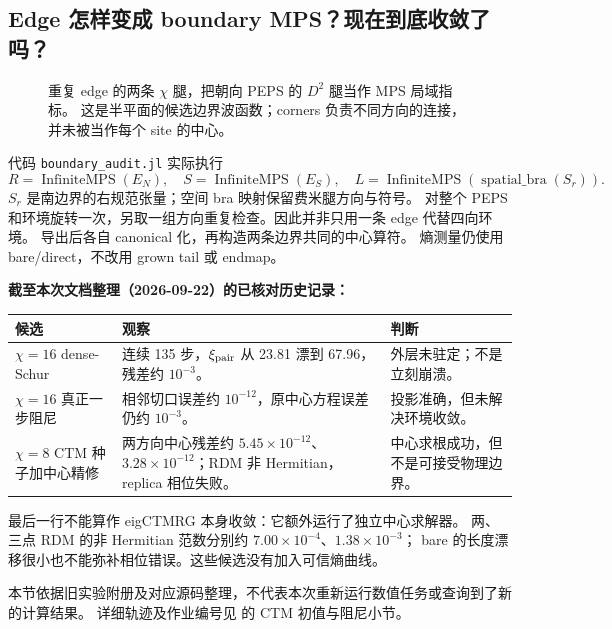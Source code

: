 \subsection{Edge 怎样变成 boundary MPS？现在到底收敛了吗？}
\begin{figure}[H]\centering
{}
\caption{重复 edge 的两条 $\chi$ 腿，把朝向 PEPS 的 $D^2$ 腿当作 MPS 局域指标。
这是半平面的候选边界波函数；corners 负责不同方向的连接，并未被当作每个 site 的中心。}
\end{figure}
代码 \texttt{boundary\_audit.jl} 实际执行
\[
R=\operatorname{InfiniteMPS}(E_N),\quad
S=\operatorname{InfiniteMPS}(E_S),\quad
L=\operatorname{InfiniteMPS}(\operatorname{spatial\_bra}(S_r)).
\]
$S_r$ 是南边界的右规范张量；空间 bra 映射保留费米腿方向与符号。
对整个 PEPS 和环境旋转一次，另取一组方向重复检查。因此并非只用一条 edge 代替四向环境。
导出后各自 canonical 化，再构造两条边界共同的中心算符。
熵测量仍使用 bare/direct，不改用 grown tail 或 endmap。

\textbf{截至本次文档整理（2026-09-22）的已核对历史记录：}
\begin{center}\small
\begin{tabular}{P{30mm}P{64mm}P{44mm}}
\toprule
候选 & 观察 & 判断\\\midrule
$\chi=16$ dense-Schur & 连续 135 步，$\xi_{\rm pair}$ 从 23.81 漂到 67.96，残差约 $10^{-3}$。 & 外层未驻定；不是立刻崩溃。\\
$\chi=16$ 真正一步阻尼 & 相邻切口误差约 $10^{-12}$，原中心方程误差仍约 $10^{-3}$。 & 投影准确，但未解决环境收敛。\\
$\chi=8$ CTM 种子加中心精修 & 两方向中心残差约 $5.45\times10^{-12}$、$3.28\times10^{-12}$；RDM 非 Hermitian，replica 相位失败。 & 中心求根成功，但不是可接受物理边界。\\
\bottomrule
\end{tabular}
\end{center}
最后一行不能算作 eigCTMRG 本身收敛：它额外运行了独立中心求解器。
两、三点 RDM 的非 Hermitian 范数分别约 $7.00\times10^{-4}$、$1.38\times10^{-3}$；
bare 的长度漂移很小也不能弥补相位错误。这些候选没有加入可信熵曲线。

本节依据旧实验附册及对应源码整理，不代表本次重新运行数值任务或查询到了新的计算结果。
详细轨迹及作业编号见  的 CTM 初值与阻尼小节。
